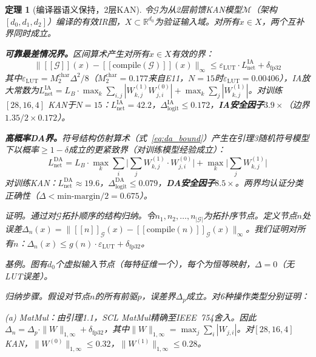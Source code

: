 \documentclass[journal,onecolumn]{IEEEtran}
\newcommand{\llbracket}{[\![}
\newcommand{\rrbracket}{]\!]}
\theoremstyle{definition}
\theoremstyle{plain}
\newtheorem{theorem}{定理}
\theoremstyle{remark}
\begin{document}
\begin{theorem}[编译器语义保持，2层KAN]
\label{thm:compiler}
令$\mathcal{G}$为从2层前馈KAN模型$\mathcal{M}$（架构$[d_0, d_1, d_2]$）编译的有效IR图，$X \subset \mathbb{R}^{d_0}$为验证输入域。对所有$x \in X$，两个互补界同时成立。

\textbf{可靠最差情况界。}区间算术产生对所有$x \in X$有效的界：
\begin{equation}
\|\llbracket\mathcal{G}\rrbracket(x) - \llbracket\text{compile}(\mathcal{G})\rrbracket(x)\|_\infty \leq \varepsilon_{\text{LUT}} \cdot L_{\text{net}}^{\text{IA}} + \delta_{\text{fp32}}
\end{equation}
其中$\varepsilon_{\text{LUT}} = M_2^{\text{char}}\Delta^2/8$（$M_2^{\text{char}} = 0.177$来自E11，$N=15$时$\varepsilon_{\text{LUT}} = 0.00406$），IA放大常数为$L_{\text{net}}^{\text{IA}} = L_B \cdot \max_k \sum_{i,j} |W^{(1)}_{k,j} W^{(0)}_{j,i}| + \max_k \sum_j |W^{(1)}_{k,j}|$。对训练$[28,16,4]$ KAN于$N=15$：$L_{\text{net}}^{\text{IA}} = 42.2$，$\Delta_{\text{logit}}^{\text{IA}} \leq \mathbf{0.172}$，\textbf{IA安全因子$3.9\times$}（边界$1.35 / 2{\times}0.172$）。

\textbf{高概率DA界。}符号结构仿射算术（式~\ref{eq:da_bound}）产生在引理3随机符号模型下以概率$\geq 1-\delta$成立的更紧致界（对训练模型经验成立）：
\begin{equation}
L_{\text{net}}^{\text{DA}} = L_B \cdot \max_k \sum_i \bigl|\sum_j W^{(1)}_{k,j} \cdot W^{(0)}_{j,i}\bigr| + \max_k \bigl|\sum_j W^{(1)}_{k,j}\bigr|
\end{equation}
对训练KAN：$L_{\text{net}}^{\text{DA}} \approx 19.6$，$\Delta_{\text{logit}}^{\text{DA}} \leq \mathbf{0.079}$，\textbf{DA安全因子$8.5\times$}。两界均认证分类正确性（$\Delta < \text{min-margin}/2 = 0.675$）。

\vspace{4pt}
\noindent\textit{证明。}通过对$\mathcal{G}$拓扑顺序的结构归纳。令$n_1, n_2, \dots, n_{|\mathcal{G}|}$为拓扑序节点。定义节点$n$处误差$\Delta_n(x) = \|\llbracket n \rrbracket_{\mathcal{G}}(x) - \llbracket\text{compile}(n) \rrbracket_{\mathcal{G}}(x)\|_\infty$。我们证明对所有$n$：$\Delta_n(x) \leq g(n) \cdot \varepsilon_{\text{LUT}} + \delta_{\text{fp32}}$。

\textit{基例。}图有$d_0$个虚拟输入节点（每特征维一个），每个为恒等映射，$\Delta = 0$（无LUT误差）。

\textit{归纳步骤。}假设对节点$n$的所有前驱$p$，误差界$\Delta_p$成立。对6种操作类型分别证明：

\noindent\textit{(a) MatMul：}由引理1.1，SCL MatMul精确至IEEE~754舍入。因此$\Delta_n = \Delta_p \cdot \|W\|_{1,\infty} + \delta_{\text{fp32}}$，其中$\|W\|_{1,\infty} = \max_j \sum_i |W_{j,i}|$。对$[28,16,4]$ KAN，$\|W^{(0)}\|_{1,\infty} \leq 0.32$，$\|W^{(1)}\|_{1,\infty} \leq 0.28$。


\end{theorem}
\end{document}

